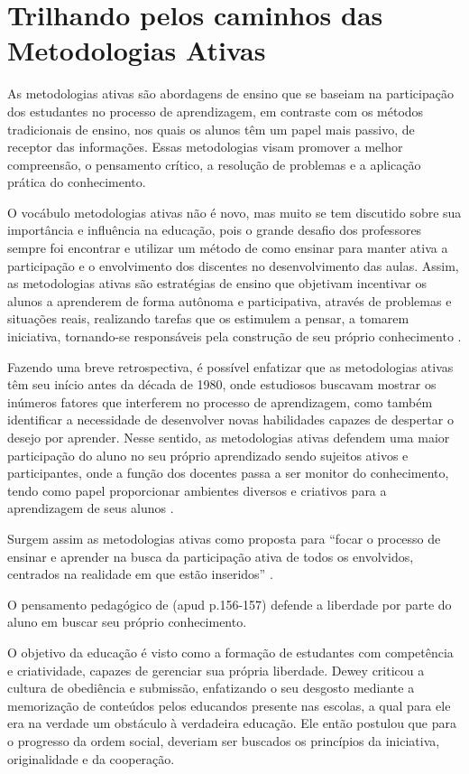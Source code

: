 \section{Trilhando pelos caminhos das Metodologias Ativas} \label{sec:2.1_MetAtiv}

As metodologias ativas são abordagens de ensino que se baseiam na participação dos estudantes no processo de aprendizagem, em contraste com os métodos tradicionais de ensino, nos quais os alunos têm um papel mais passivo, de receptor das informações. Essas metodologias visam promover a melhor compreensão, o pensamento crítico, a resolução de problemas e a aplicação prática do conhecimento.

O vocábulo metodologias ativas não é novo, mas muito se tem discutido sobre sua importância e influência na educação, pois o grande desafio dos professores sempre foi encontrar e utilizar um método de como ensinar para manter ativa a participação e o envolvimento dos discentes no desenvolvimento das aulas. Assim, as metodologias ativas são estratégias de ensino que objetivam incentivar os alunos a aprenderem de forma autônoma e participativa, através de problemas e situações reais, realizando tarefas que os estimulem a pensar, a tomarem iniciativa, tornando-se responsáveis pela construção de seu próprio conhecimento \cite[p. 12]{DIESEL2017}.

Fazendo uma breve retrospectiva, é possível enfatizar que as metodologias ativas têm seu início antes da década de 1980, onde estudiosos buscavam mostrar os inúmeros fatores que interferem no processo de aprendizagem, como também identificar a necessidade de desenvolver novas habilidades capazes de despertar o desejo por aprender. Nesse sentido, as metodologias ativas defendem uma maior participação do aluno no seu próprio aprendizado sendo sujeitos ativos e participantes, onde a função dos docentes passa a ser monitor do conhecimento, tendo como papel proporcionar ambientes diversos e criativos para a aprendizagem de seus alunos \cite[p. 263]{Mota2018}.

Surgem assim as metodologias ativas como proposta para ``focar o processo de ensinar e aprender na busca da participação ativa de todos os envolvidos, centrados na realidade em que estão inseridos'' \cite[p. 66]{FIALHO2017}.

O pensamento pedagógico de  (apud \cite{LOVATO2018} p.156-157) defende a liberdade por parte do aluno em buscar seu próprio conhecimento.

\begin{citacao}
    O objetivo da educação é visto como a formação de estudantes com competência e criatividade, capazes de gerenciar sua própria liberdade. Dewey criticou a cultura de obediência e submissão, enfatizando o seu desgosto mediante a memorização de conteúdos pelos educandos presente nas escolas, a qual para ele era na verdade um obstáculo à verdadeira educação. Ele então postulou que para o progresso da ordem social, deveriam ser buscados os princípios da iniciativa, originalidade e da cooperação.
\end{citacao}

